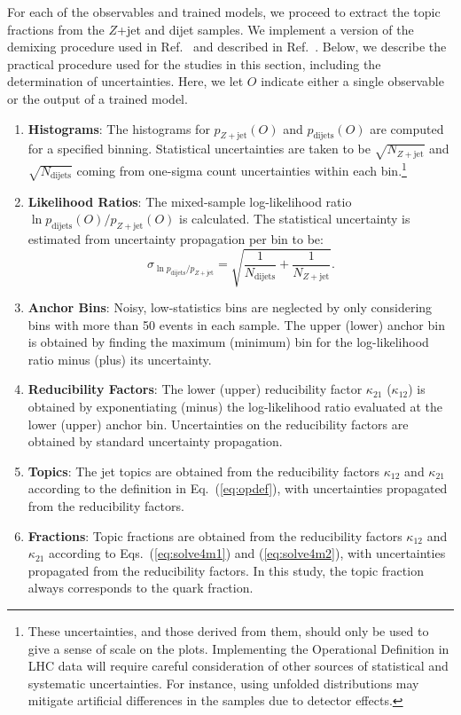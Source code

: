 \documentclass[letterpaper,11pt]{article}
\DeclareRobustCommand{\Eq}[1]{Eq.~(\ref{#1})}
\DeclareRobustCommand{\Eqs}[2]{Eqs.~(\ref{#1}) and (\ref{#2})}
\DeclareRobustCommand{\Ref}[1]{Ref.~\cite{#1}}
\begin{document}
For each of the observables and trained models, we proceed to extract the topic fractions from the $Z$+jet and dijet samples.
%
We implement a version of the demixing procedure used in \Ref{Metodiev:2018ftz} and described in \Ref{katz2017decontamination}.
%
Below, we describe the practical procedure used for the studies in this section, including the determination of uncertainties.
%
Here, we let $O$ indicate either a single observable or the output of a trained model.

\begin{enumerate}
%
\item {\bf Histograms}: The histograms for $p_\text{$Z+$jet}(O)$ and $p_\text{dijets}(O)$ are computed for a specified binning. Statistical uncertainties are taken to be $\sqrt{N_\text{$Z+$jet}}$ and $\sqrt{N_\text{dijets}}$ coming from one-sigma count uncertainties within each bin.\footnote{These uncertainties, and those derived from them, should only be used to give a sense of scale on the plots. Implementing the Operational Definition in LHC data will require careful consideration of other sources of statistical and systematic uncertainties. For instance, using unfolded distributions may mitigate artificial differences in the samples due to detector effects.}
%
\item {\bf Likelihood Ratios}: The mixed-sample log-likelihood ratio $\ln p_\text{dijets}(O)/p_\text{$Z+$jet}(O)$ is calculated. The statistical uncertainty is estimated from uncertainty propagation per bin to be:
\begin{equation}
\sigma_{\ln p_\text{dijets}/p_\text{$Z+$jet}} = \sqrt{\frac{1}{N_\text{dijets}} + \frac{1}{N_\text{$Z+$jet}}}.
\end{equation}
%
\item {\bf Anchor Bins}: Noisy, low-statistics bins are neglected by only considering bins with more than 50 events in each sample. The upper (lower) anchor bin is obtained by finding the maximum (minimum) bin for the log-likelihood ratio minus (plus) its uncertainty.
%
\item {\bf Reducibility Factors}: The lower (upper) reducibility factor $\kappa_{21}$ ($\kappa_{12}$) is obtained by exponentiating (minus) the log-likelihood ratio evaluated at the lower (upper) anchor bin. Uncertainties on the reducibility factors are obtained by standard uncertainty propagation.
%
\item {\bf Topics}: The jet topics are obtained from the reducibility factors $\kappa_{12}$ and $\kappa_{21}$ according to the definition in \Eq{eq:opdef}, with uncertainties propagated from the reducibility factors.
%
\item {\bf Fractions}: Topic fractions are obtained from the reducibility factors $\kappa_{12}$ and $\kappa_{21}$ according to \Eqs{eq:solve4m1}{eq:solve4m2}, with uncertainties propagated from the reducibility factors.
%
In this study, the topic fraction always corresponds to the quark fraction.
%
\end{enumerate}
\end{document}
